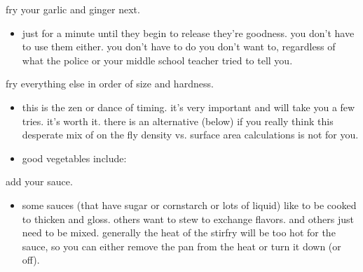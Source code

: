 \begin{algorithm}
  \item fry your garlic and ginger next.
  \begin{itemize}
    \item just for a minute until they begin to release they're goodness. you don't have to use them either. you don't have to do  you don't want to, regardless of what the police or your middle school teacher tried to tell you.
  \end{itemize}

  \item fry everything else in order of size and hardness.
  \begin{itemize}
    \item this is the zen or dance of timing. it's very important and will take you a few tries. it's worth it. there is an alternative (below) if you really think this desperate mix of on the fly density vs. surface area calculations is not for you.
    \item good vegetables include:
  \end{itemize}

  \item add your sauce.
  \begin{itemize}
    \item some sauces (that have sugar or cornstarch or lots of liquid) like to be cooked to thicken and gloss. others want to stew to exchange flavors. and others just need to be mixed. generally the heat of the stirfry will be too hot for the sauce, so you can either remove the pan from the heat or turn it down (or off).
  \end{itemize}

\end{algorithm}

